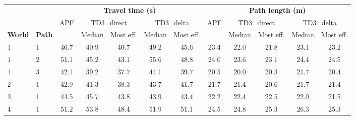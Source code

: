 \begin{tabular}{ll|ccccc|ccccc}
\midrule[1.5pt]
 & & \multicolumn{5}{c|}{\textbf{Travel time (s)}} & \multicolumn{5}{c}{\textbf{Path length (m)}} \\
 & & APF & \multicolumn{2}{c}{TD3\_direct} & \multicolumn{2}{c|}{TD3\_delta} & APF & \multicolumn{2}{c}{TD3\_direct} & \multicolumn{2}{c}{TD3\_delta} \\
\textbf{World} & \textbf{Path} & & Median & Most eff. & Median & Most eff. & & Median & Most eff. & Median & Most eff. \\
\midrule[1.5pt]
1 & 1 & 46.7 & 40.9 & 40.7 & 49.2 & 45.6 & 23.4 & 22.0 & 21.8 & 23.1 & 23.2 \\
1 & 2 & 51.1 & 45.2 & 43.1 & 55.6 & 48.8 & 24.0 & 23.6 & 23.1 & 24.4 & 24.5 \\
1 & 3 & 42.1 & 39.2 & 37.7 & 44.1 & 39.7 & 20.5 & 20.0 & 20.3 & 21.7 & 20.4 \\
2 & 1 & 42.9 & 41.3 & 38.3 & 43.7 & 41.7 & 21.7 & 21.4 & 20.6 & 21.7 & 21.4 \\
3 & 1 & 44.5 & 45.7 & 43.8 & 43.9 & 43.4 & 22.2 & 22.4 & 22.5 & 22.0 & 21.5 \\
4 & 1 & 51.2 & 53.8 & 48.4 & 51.9 & 51.1 & 24.5 & 24.8 & 25.3 & 26.3 & 25.3 \\
\midrule[1.5pt]
\end{tabular}
